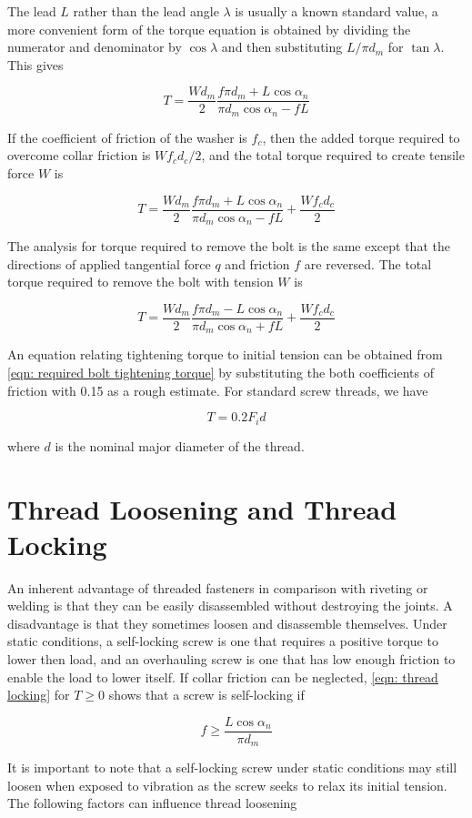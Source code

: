 \documentclass[a4paper,openany,12pt]{book}
\begin{document}
{{The lead \(L\) rather than the lead angle \(\lambda\) is usually a known
standard value, a more convenient form of the torque equation is
obtained by dividing the numerator and denominator by \(\cos \lambda\) and
then substituting \(L/\pi d_m\) for \(\tan \lambda\). This gives

$$T = \frac{Wd_m}{2}\frac{f\pi d_m + L\cos \alpha_n}{\pi d_m\cos \alpha_n - fL}$$

If the coefficient of friction of the washer is \(f_c\), then the added
torque required to overcome collar friction is \(Wf_cd_c/2\), and the
total torque required to create tensile force \(W\) is

$$T = \frac{Wd_m}{2}\frac{f\pi d_m + L\cos \alpha_n}{\pi d_m\cos \alpha_n - fL} + \frac{Wf_cd_c}{2}$$

The analysis for torque required to remove the bolt is the same except
that the directions of applied tangential force \(q\) and friction \(f\) are
reversed. The total torque required to remove the bolt with tension \(W\)
is

$$T = \frac{Wd_m}{2}\frac{f\pi d_m - L\cos \alpha_n}{\pi d_m\cos \alpha_n + fL} + \frac{Wf_cd_c}{2}$$

An equation relating tightening torque to initial tension can be
obtained from
\ref{eqn: required bolt tightening torque}
by substituting the both coefficients of friction with 0.15 as a rough
estimate. For standard screw threads, we have

$$T = 0.2F_id$$

where \(d\) is the nominal major diameter of the thread.

\section{Thread Loosening and Thread Locking}
\label{thread-loosening-and-thread-locking}
An inherent advantage of threaded fasteners in comparison with riveting
or welding is that they can be easily disassembled without destroying
the joints. A disadvantage is that they sometimes loosen and disassemble
themselves. Under static conditions, a self-locking screw is one that
requires a positive torque to lower then load, and an overhauling screw
is one that has low enough friction to enable the load to lower itself.
If collar friction can be neglected,
\ref{eqn: thread locking} for \(T \geqslant 0\)
shows that a screw is self-locking if

$$f \geqslant \frac{L\cos \alpha_n}{\pi d_m}$$

It is important to note that a self-locking screw under static
conditions may still loosen when exposed to vibration as the screw seeks
to relax its initial tension. The following factors can influence thread
loosening

}}
\end{document}
